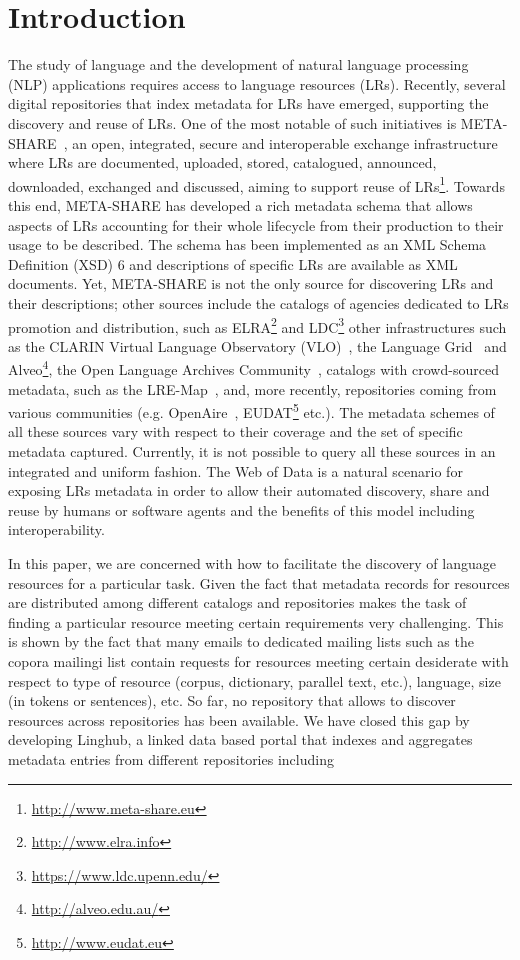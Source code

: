 \documentclass[smallextended]{svjour3}       %
\begin{document}
\section{Introduction}

The study of language and the development of natural language processing (NLP)
applications requires access to language resources (LRs). Recently, several
digital repositories that index metadata for LRs have emerged, supporting the
discovery and reuse of LRs. One of the most notable of such initiatives is
META-SHARE~\cite{federmann2012meta}, an open, integrated, secure and interoperable exchange
infrastructure where LRs are documented, uploaded, stored, catalogued,
announced, downloaded, exchanged and discussed, aiming to support reuse of
LRs\footnote{\url{http://www.meta-share.eu}}. Towards this end, META-SHARE has developed a rich
metadata schema that allows aspects of LRs accounting for their whole lifecycle
from their production to their usage to be described. The schema has been
implemented as an XML Schema Definition (XSD) 6 and descriptions of specific LRs
are available as XML documents. Yet, META-SHARE is not the only source for
discovering LRs and their descriptions; other sources include the catalogs of
agencies dedicated to LRs promotion and distribution, such as
ELRA\footnote{\url{http://www.elra.info}} and
LDC\footnote{\url{https://www.ldc.upenn.edu/}}
other infrastructures such as the CLARIN Virtual Language Observatory
(VLO)~\cite{van2012semantic}, the Language Grid~\cite{ishida2006language} and
Alveo\footnote{\url{http://alveo.edu.au/}}, the Open Language Archives
Community~\cite[OLAC]{simons2003open}, catalogs with crowd-sourced metadata,
such as the LRE-Map~\cite{calzolari2012lre}, and,
more recently, repositories coming from various communities (e.g.
OpenAire~\cite{manghi2010infrastructure},
EUDAT\footnote{\url{http://www.eudat.eu}} etc.). The metadata schemes of all these sources vary with respect to
their coverage and the set of specific metadata captured. Currently, it is not
possible to query all these sources in an integrated and uniform fashion. The
Web of Data is a natural scenario for exposing LRs metadata in order to allow
their automated discovery, share and reuse by humans or software agents and the
benefits of this model including interoperability.

In this paper, we are concerned with how to facilitate the discovery of language
resources for a particular task. Given the fact that metadata records for
resources are distributed among different catalogs and repositories makes the
task of finding a particular resource meeting certain requirements very
challenging. This is shown by the fact that many emails to dedicated
mailing lists such as the copora mailingi list contain requests for resources
meeting certain desiderate with respect to type of resource (corpus, dictionary,
parallel text, etc.), language, size (in tokens or sentences), etc.
So far, no repository that allows to discover resources across repositories has
been available. We have closed this gap by developing Linghub, a linked data
based portal that indexes and aggregates metadata entries from different
repositories including 
\end{document}
